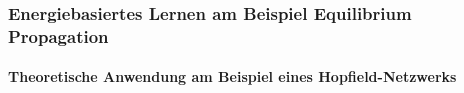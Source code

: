\subsubsection{Energiebasiertes Lernen am Beispiel Equilibrium Propagation}





\paragraph{Theoretische Anwendung am Beispiel eines Hopfield-Netzwerks}
